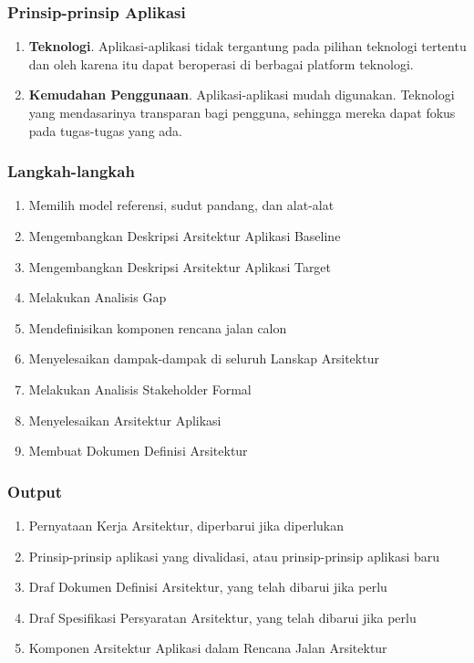 \documentclass[aspectratio=169, table]{beamer}
\begin{document}
\begin{frame}
	\frametitle{Prinsip-prinsip Aplikasi}
	\begin{enumerate}
		\item \textbf{Teknologi}.
		Aplikasi-aplikasi tidak tergantung pada pilihan teknologi tertentu dan oleh karena itu dapat beroperasi di berbagai platform teknologi.
		\item \textbf{Kemudahan Penggunaan}.
		Aplikasi-aplikasi mudah digunakan. Teknologi yang mendasarinya transparan bagi pengguna, sehingga mereka dapat fokus pada tugas-tugas yang ada.
	\end{enumerate}
\end{frame}


\begin{frame}
	\frametitle{Langkah-langkah}
	\begin{enumerate}
		\item Memilih model referensi, sudut pandang, dan alat-alat
		\item Mengembangkan Deskripsi Arsitektur Aplikasi Baseline
		\item Mengembangkan Deskripsi Arsitektur Aplikasi Target
		\item Melakukan Analisis Gap
		\item Mendefinisikan komponen rencana jalan calon
		\item Menyelesaikan dampak-dampak di seluruh Lanskap Arsitektur
		\item Melakukan Analisis Stakeholder Formal
		\item Menyelesaikan Arsitektur Aplikasi
		\item Membuat Dokumen Definisi Arsitektur
	\end{enumerate}
\end{frame}

\begin{frame}
	\frametitle{Output}
	\begin{enumerate}
		\item Pernyataan Kerja Arsitektur, diperbarui jika diperlukan
		\item Prinsip-prinsip aplikasi yang divalidasi, atau prinsip-prinsip aplikasi baru
		\item Draf Dokumen Definisi Arsitektur, yang telah dibarui jika perlu
		\item Draf Spesifikasi Persyaratan Arsitektur, yang telah dibarui jika perlu
		\item Komponen Arsitektur Aplikasi dalam Rencana Jalan Arsitektur
	\end{enumerate}
\end{frame}
\end{document}

